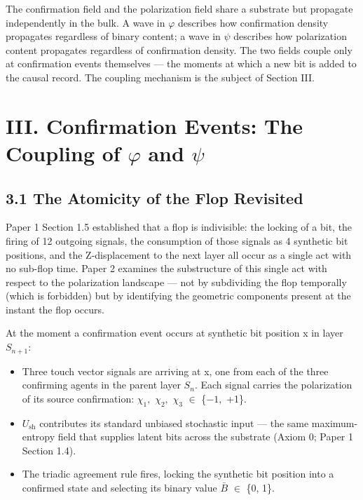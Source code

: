 \documentclass[11pt,oneside]{report}
\theoremstyle{definition}
\theoremstyle{remark}
\begin{document}
The confirmation field and the polarization field share a substrate but
propagate independently in the bulk. A wave in \ensuremath{\varphi} describes how
confirmation density propagates regardless of binary content; a wave in
\ensuremath{\psi} describes how polarization content propagates regardless of
confirmation density. The two fields couple only at confirmation events
themselves --- the moments at which a new bit is added to the causal
record. The coupling mechanism is the subject of Section III.

\section*{III. Confirmation Events: The Coupling of \ensuremath{\varphi} and \ensuremath{\psi}}

\subsection*{3.1 The Atomicity of the Flop Revisited}

Paper 1 Section 1.5 established that a flop is indivisible: the locking
of a bit, the firing of 12 outgoing signals, the consumption of those
signals as 4 synthetic bit positions, and the Z-displacement to the next
layer all occur as a single act with no sub-flop time. Paper 2 examines
the substructure of this single act with respect to the polarization
landscape --- not by subdividing the flop temporally (which is
forbidden) but by identifying the geometric components present at the
instant the flop occurs.

At the moment a confirmation event occurs at synthetic bit position x in
layer \ensuremath{S_{n+1}:}

\begin{itemize}
\item
  Three touch vector signals are arriving at x, one from each of the
  three confirming agents in the parent layer \ensuremath{S_{n}.} Each signal carries
  the polarization of its source confirmation: \ensuremath{\chi_{1},} \ensuremath{\chi_{2},} \ensuremath{\chi_{3}} \ensuremath{\in} \{\ensuremath{-1,} +1\}.
\item
  \ensuremath{U_{\mathrm{sh}}} contributes its standard unbiased stochastic input --- the same
  maximum-entropy field that supplies latent bits across the substrate
  (Axiom 0; Paper 1 Section 1.4).
\item
  The triadic agreement rule fires, locking the synthetic bit position
  into a confirmed state and selecting its binary value \ensuremath{\bar{B}} \ensuremath{\in} \{0, 1\}.
\end{itemize}
\end{document}
